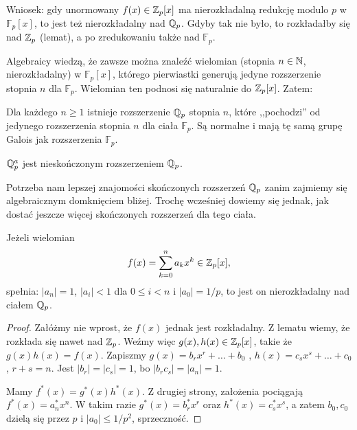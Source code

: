 Wniosek: gdy unormowany $f(x) \in \mathbb Z_p[x]$ ma nierozkładalną redukcję modulo $p$ w $\mathbb F_p[x]$, to jest też nierozkładalny nad $\mathbb Q_p$.
Gdyby tak nie było, to rozkładałby się nad $\mathbb Z_p$ (lemat), a po zredukowaniu także nad $\mathbb F_p$.

Algebraicy wiedzą, że zawsze można znaleźć wielomian (stopnia $n \in \mathbb N$, nierozkładalny) w $\mathbb F_p[x]$, którego pierwiastki generują jedyne rozszerzenie stopnia $n$ dla $\mathbb F_p$.
Wielomian ten podnosi się naturalnie do $\mathbb Z_p[x]$. Zatem:

\begin{fakt}
	Dla każdego $n \ge 1$ istnieje rozszerzenie $\mathbb Q_p$ stopnia $n$, które ,,pochodzi'' od jedynego rozszerzenia stopnia $n$ dla ciała $\mathbb F_p$.
	Są normalne i mają tę samą grupę Galois jak rozszerzenia $\mathbb F_p$.
\end{fakt}

\begin{wniosek}
	$\mathbb Q_p^a$ jest nieskończonym rozszerzeniem $\mathbb Q_p$.
\end{wniosek}

Potrzeba nam lepszej znajomości skończonych rozszerzeń $\mathbb Q_p$ zanim zajmiemy się algebraicznym domknięciem bliżej.  
Trochę wcześniej dowiemy się jednak, jak dostać jeszcze więcej skończonych rozszerzeń dla tego ciała.

\begin{twierdzenie}\label{einstein}
	Jeżeli wielomian
	\[
		f(x) = \sum_{k=0}^n a_kx^k \in \mathbb Z_p[x],
	\]
	spełnia: $|a_n| = 1$, $|a_i| < 1$ dla $0 \le i < n$ i $|a_0| = 1/p$, to jest on nierozkładalny nad ciałem $\mathbb Q_p$.
\end{twierdzenie}

\begin{proof}
	Załóżmy nie wprost, że $f(x)$ jednak jest rozkładalny.
	Z lematu wiemy, że rozkłada się nawet nad $\mathbb Z_p$.
	Weźmy więc $g(x), h(x) \in \mathbb Z_p[x]$, takie że $g(x) h(x) = f(x)$.
	Zapiszmy $g(x) = b_rx^r + \dots + b_0$ , $h(x) = c_s x^s + \dots + c_0$, $r+s = n$.
	Jest $|b_r| = |c_s| = 1$, bo $|b_rc_s| = |a_n| = 1$.

	Mamy $f^*(x) = g^*(x)h^*(x)$.
	Z drugiej strony, założenia pociągają $f^*(x) = a_n^* x^n$.
	W takim razie $g^*(x) = b^*_r x^r$ oraz $h^*(x) = c_s^* x^s$, a zatem $b_0, c_0$ dzielą się przez $p$ i $|a_0| \le 1/p^2$, sprzeczność.
\end{proof}